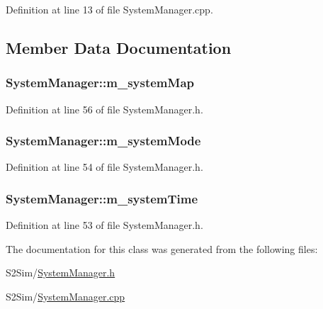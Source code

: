 Definition at line 13 of file System\-Manager.\-cpp.



\subsection{Member Data Documentation}
\hypertarget{class_system_manager_a74a1b7e836ad95da039de9eb367544c3}{
\subsubsection[{m\-\_\-system\-Map}]{ System\-Manager\-::m\-\_\-system\-Map\hspace{0.3cm}{\ttfamily [private]}}}\label{class_system_manager_a74a1b7e836ad95da039de9eb367544c3}


Definition at line 56 of file System\-Manager.\-h.

\hypertarget{class_system_manager_a25bf998fe8f48168e2ad4c3dfd3bad91}{
\subsubsection[{m\-\_\-system\-Mode}]{ System\-Manager\-::m\-\_\-system\-Mode\hspace{0.3cm}{\ttfamily [private]}}}\label{class_system_manager_a25bf998fe8f48168e2ad4c3dfd3bad91}


Definition at line 54 of file System\-Manager.\-h.

\hypertarget{class_system_manager_af5a7fec3622669af269cbcf7b1b2af22}{
\subsubsection[{m\-\_\-system\-Time}]{ System\-Manager\-::m\-\_\-system\-Time\hspace{0.3cm}{\ttfamily [private]}}}\label{class_system_manager_af5a7fec3622669af269cbcf7b1b2af22}


Definition at line 53 of file System\-Manager.\-h.



The documentation for this class was generated from the following files\-:\begin{DoxyCompactItemize}
\item 
S2\-Sim/\hyperlink{_system_manager_8h}{System\-Manager.\-h}\item 
S2\-Sim/\hyperlink{_system_manager_8cpp}{System\-Manager.\-cpp}\end{DoxyCompactItemize}
